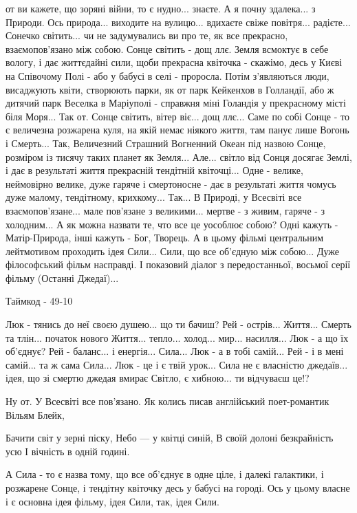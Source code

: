 от ви кажете, що зоряні війни, то є нудно... знаєте. А я почну здалека... з
Природи. Ось природа... виходите на вулицю... вдихаєте свіже повітря...
радієте... Сонечко світить... чи не задумувались ви про те, як все прекрасно,
взаємопов'язано між собою. Сонце світить - дощ ллє. Земля всмоктує в себе
вологу, і дає життєдайні сили, щоби прекрасна квіточка - скажімо, десь у Києві
на Співочому Полі - або у бабусі в селі -  проросла. Потім з'являються люди,
висаджують квіти, створюють парки, як от парк Кейкенхов в Голландії, або ж
дитячий парк Веселка в Маріуполі - справжня міні Голандія у прекрасному місті
біля Моря... Так от. Сонце світить, вітер віє... дощ ллє... Саме по собі Сонце
- то є величезна розжарена куля, на якій немає ніякого життя, там панує лише
Вогонь і Смерть... Так, Величезний Страшний Вогненний Океан під назвою Сонце,
розміром із тисячу таких планет як Земля... Але... світло від Сонця досягає
Землі, і дає в результаті життя прекрасній тендітній квіточці... Одне - велике,
неймовірно велике, дуже гаряче і смертоносне - дає в результаті життя чомусь
дуже малому, тендітному, крихкому... Так... В Природі, у Всесвіті все
взаємопов'язане... мале пов'язане з великими... мертве - з живим, гаряче - з
холодним... А як можна назвати те, что все це уособлює собою? Одні кажуть -
Матір-Природа, інші кажуть - Бог, Творець. А в цьому фільмі центральним
лейтмотивом проходить ідея Сили... Сили, що все об'єдную між собою... Дуже
філософський фільм насправді. І показовий діалог з передостанньої, восьмої серії
фільму (Останні Джедаї)... 

Таймкод - 49-10

Люк - тянись до неї своєю душею...  що ти бачиш?
Рей - острів... Життя... Смерть та тлін... початок нового Життя... тепло...
холод... мир... насилля... 
Люк - а що їх об'єднує?
Рей - баланс... і енергія... Сила...
Люк - а в тобі самій...
Рей - і в мені самій... та ж сама Сила... 
Люк - це і є твій урок... Сила не є власністю джедаїв...
ідея, що зі смертю джедая вмирає Світло, є хибною... ти відчуваєш це!? 

Ну от. У Всесвіті все пов'язано. Як колись писав англійський поет-романтик Вільям Блейк, 

Бачити світ у зерні піску, Небо — у квітці синій, В своїй долоні безкрайність усю І вічність в одній годині.

А Сила - то є назва тому, що все об'єднує
в одне ціле, і далекі галактики, і розжарене Сонце, і тендітну квіточку десь у бабусі на городі.
Ось у цьому власне і є основна ідея фільму, ідея Сили, так, ідея Сили.

